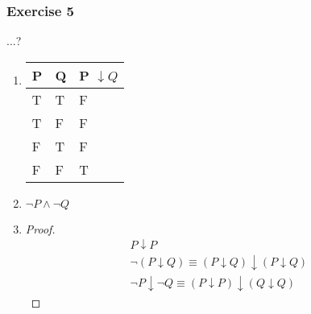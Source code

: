 \subsubsection{Exercise 5}

\question ...?

\begin{solution}
    \begin{enumerate}[label=(\alph*)]
        \item {
            \begin{tabular}[c]{l l |l}
            P & Q  & P $\downarrow Q$ \\ \hline
            T & T & F \\
            T & F & F \\
            F & T & F \\
            F & F & T
            \end{tabular}
        }
        
        \item {$\neg P \wedge \neg Q$}
        
        \item {
            \begin{proof}
                \begin{align*}
                    P \downarrow P \\
                    \neg (P \downarrow Q) \equiv (P \downarrow Q) \downarrow (P \downarrow Q) \\
                    \neg P \downarrow \neg Q \equiv (P \downarrow P) \downarrow (Q \downarrow Q)
                \end{align*}
            \end{proof}
        }
    \end{enumerate}
\end{solution}

